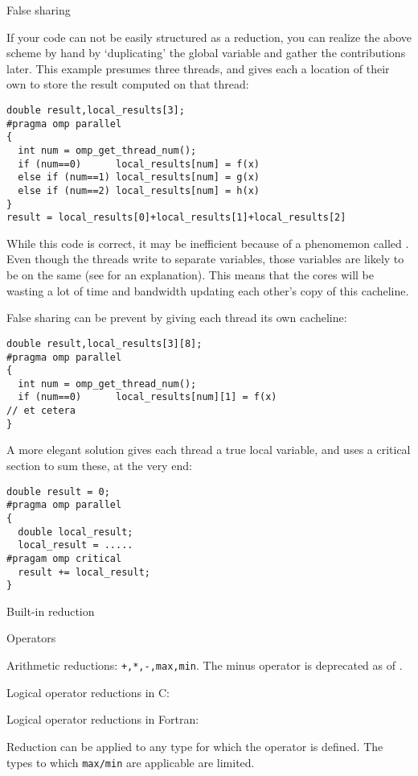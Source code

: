  {False sharing}

If your code can not be easily structured as a reduction, you can 
realize the above scheme by hand by
`duplicating' the global variable and gather the contributions later.
This example presumes three threads, and gives each a location of their
own to store the result computed on that thread:
\begin{lstlisting}
double result,local_results[3];
#pragma omp parallel
{
  int num = omp_get_thread_num();
  if (num==0)      local_results[num] = f(x)
  else if (num==1) local_results[num] = g(x)
  else if (num==2) local_results[num] = h(x)
}
result = local_results[0]+local_results[1]+local_results[2]
\end{lstlisting}
While this code is correct, it may be inefficient because of a
phenomemon called . Even though the threads write
to separate variables, those variables are likely to be on the same 
 (see  for an explanation).
This means that the cores will be wasting a lot of time and bandwidth updating
each other's copy of this cacheline.

False sharing can be prevent by giving each thread its own cacheline:
\begin{lstlisting}
double result,local_results[3][8];
#pragma omp parallel
{
  int num = omp_get_thread_num();
  if (num==0)      local_results[num][1] = f(x)
// et cetera
}
\end{lstlisting}
A more elegant solution gives each thread a true local variable,
and uses a critical section to sum these, at the very end:
\begin{lstlisting}
double result = 0;
#pragma omp parallel
{
  double local_result;
  local_result = .....
#pragam omp critical
  result += local_result;
}
\end{lstlisting}

 {Built-in reduction}

 {Operators}

Arithmetic reductions: \lstinline{+,*,-,max,min}.
The minus operator is deprecated as of .

Logical operator reductions in C: \n{& && | || ^}

Logical operator reductions in Fortran:

Reduction can be applied to any type for which the operator is defined.
The types to which \lstinline{max/min} are applicable are limited.

